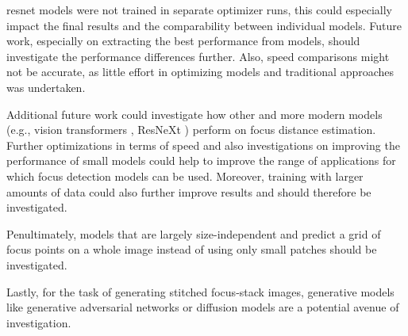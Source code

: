 \Ac{resnet} models were not trained in separate optimizer runs, this could especially impact the final results and the comparability between individual models. Future work, especially on extracting the best performance from models, should investigate the performance differences further. 
Also, speed comparisons might not be accurate, as little effort in optimizing models and traditional approaches was undertaken.

Additional future work could investigate how other and more modern models (e.g., vision transformers \cite{dosovitskiy2021image}, ResNeXt \cite{xie2017aggregated}) perform on focus distance estimation. Further optimizations in terms of speed and also investigations on improving the performance of small models could help to improve the range of applications for which focus detection models can be used.
Moreover, training with larger amounts of data could also further improve results and should therefore be investigated.

Penultimately, models that are largely size-independent and predict a grid of focus points on a whole image instead of using only small patches should be investigated.

Lastly, for the task of generating stitched focus-stack images, generative models like generative adversarial networks \cite{goodfellow2014generative} or diffusion models \cite{dhariwal2021diffusion} are a potential avenue of investigation.